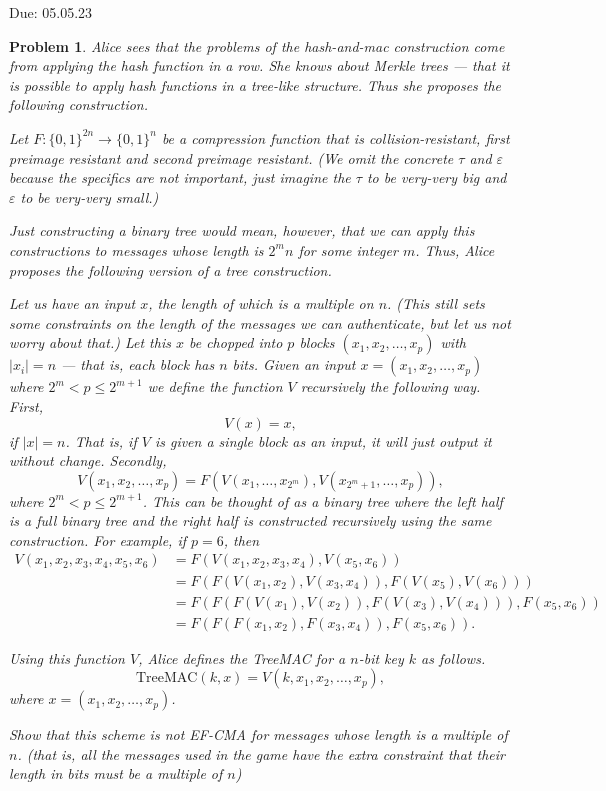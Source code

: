 \documentclass{../homework}
\newtheorem{problem}{Problem}
\begin{document}
{Due: 05.05.23}{\profname}{\myname}

\begin{problem}
    Alice sees that the problems of the hash-and-mac construction come from
    applying the hash function in a row. She knows about Merkle trees --- that
    it is possible to apply hash functions in a tree-like structure. Thus she
    proposes the following construction.
    
    Let $F:\{0,1\}^{2n} \rightarrow \{0,1\}^n$ be a compression function that
    is collision-resistant, first preimage resistant and second preimage
    resistant. (We omit the concrete $\tau$  and $\varepsilon$ because the
    specifics are not important, just imagine the $\tau$ to be very-very big
    and $\varepsilon$ to be very-very small.)
    
    Just constructing a binary tree would mean, however, that we can apply this
    constructions to messages whose length is $2^mn$ for some integer $m$.
    Thus, Alice proposes the following version of a tree construction.
    
    Let us have an input $x$, the length of which is a multiple on $n$. (This
    still sets some constraints on the length of the messages we can
    authenticate, but let us not worry about that.) Let this $x$ be chopped
    into $p$ blocks $(x_1,x_2,\dots,x_p)$ with $|x_i|=n$ --- that is, each
    block has $n$ bits. Given an input $x=(x_1,x_2,\dots,x_p)$ where
    $2^m<p\leq 2^{m+1}$ we define the function $V$ recursively the following
    way. First,
    $$
        V(x)=x,
    $$
    if $|x|=n$. That is, if $V$ is given a single block as an input, it will
    just output it without change. Secondly,
    $$
        V(x_1,x_2,\dots,x_p)=
        F(V(x_1,\dots,x_{2^{m}}),V(x_{2^{m}+1},\dots,x_p)),
    $$
    where $2^m<p\leq 2^{m+1}$. This can be thought of as a binary tree where
    the left half is a full binary tree and the right half is constructed
    recursively  using the same construction. For example, if $p=6$, then
    \begin{align*}
        V(x_1,x_2,x_3,x_4,x_5,x_6) &= F(V(x_1,x_2,x_3,x_4),V(x_5,x_6))\\
        &= F(F(V(x_1,x_2),V(x_3,x_4)), F(V(x_5),V(x_6)))\\
        &= F(F(F(V(x_1),V(x_2)), F(V(x_3),V(x_4))), F(x_5,x_6))\\
        &= F(F(F(x_1,x_2), F(x_3,x_4)), F(x_5,x_6)).
    \end{align*}
    
    Using this function $V$, Alice defines the TreeMAC for a $n$-bit key $k$ as
    follows.
    $$\text{TreeMAC}(k,x)=V(k,x_1,x_2,\dots,x_p),$$
    where $x=(x_1,x_2,\dots,x_p)$.
    
    Show that this scheme is not EF-CMA for messages whose length is a multiple
    of $n$. (that is, all the messages used in the game have the extra
    constraint that their length in bits must be a multiple of $n$)
\end{problem}
\end{document}

